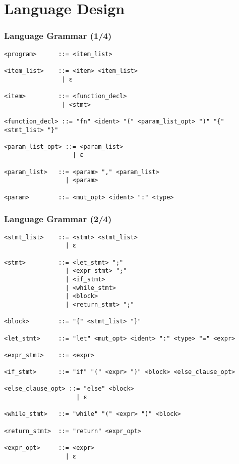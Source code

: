 \documentclass{beamer}
\begin{document}
\section{Language Design}
\begin{frame}[fragile]
\frametitle{Language Grammar (1/4)}
\begin{lstlisting}[language=bnf,basicstyle=\tiny]
<program>      ::= <item_list>

<item_list>    ::= <item> <item_list>
                | ε

<item>         ::= <function_decl>
                | <stmt>

<function_decl> ::= "fn" <ident> "(" <param_list_opt> ")" "{" <stmt_list> "}"

<param_list_opt> ::= <param_list>
                   | ε

<param_list>   ::= <param> "," <param_list>
                 | <param>

<param>        ::= <mut_opt> <ident> ":" <type>
\end{lstlisting}
\end{frame}

\begin{frame}[fragile]
\frametitle{Language Grammar (2/4)}
\begin{lstlisting}[language=bnf,basicstyle=\tiny]
<stmt_list>    ::= <stmt> <stmt_list>
                 | ε

<stmt>         ::= <let_stmt> ";"
                 | <expr_stmt> ";"
                 | <if_stmt>
                 | <while_stmt>
                 | <block>
                 | <return_stmt> ";"

<block>        ::= "{" <stmt_list> "}"

<let_stmt>     ::= "let" <mut_opt> <ident> ":" <type> "=" <expr>

<expr_stmt>    ::= <expr>

<if_stmt>      ::= "if" "(" <expr> ")" <block> <else_clause_opt>

<else_clause_opt> ::= "else" <block>
                    | ε

<while_stmt>   ::= "while" "(" <expr> ")" <block>

<return_stmt>  ::= "return" <expr_opt>

<expr_opt>     ::= <expr>
                 | ε
\end{lstlisting}
\end{frame}
\end{document}
